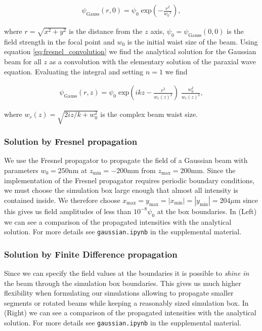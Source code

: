 \begin{align*}
    \psi_\text{Gauss}(r,0) = \psi_0 \; \text{exp}  \mathopen{} \left(-\frac{ r^2 }{{w_0}^{2}} \right) \mathclose{},
\end{align*}

where $r = \sqrt{x^2 + y^2}$ is the distance from the $z$ axis, $\psi_0 = \psi_\text{Gauss}(0,0)$ is the field strength in the focal point and $w_0$ is the initial waist size of the beam. Using equation \eqref{eq:fresnel_convolution} we find the analytical solution for the Gaussian beam for all $z$ as a convolution with the elementary solution of the paraxial wave equation. Evaluating the integral and setting $n = 1$ we find

\begin{align*}
    \psi_\text{Gauss}(r,z) = \psi_0 \; \text{exp} \mathopen{} \left(i k z -\frac{ r^2 }{{w_r(z)}^{2}} \right) \mathclose{} \; \frac{w_0^2}{w_r(z)^2} ,
\end{align*}

where $w_r(z) = \sqrt{2iz/k + w_0^2}$ is the complex beam waist size.

\subsubsection{Solution by Fresnel propagation}

We use the Fresnel propagator to propagate the field of a Gaussian beam with parameters $w_0 = 250\text{nm}$ at $z_\text{min} = -200\mathrm{mm}$ from $z_\text{max} = 200\mathrm{mm}$. Since the implementation of the Fresnel propagator requires periodic boundary conditions, we must choose the simulation box large enough that almost all intensity is contained inside. We therefore choose $x_\text{max} = y_\text{max} = |x_\text{min}| = |y_\text{min}| = 204 \mu\text{m}$ since this gives us field amplitudes of less than $10^{-8} \psi_0$ at the box boundaries. In  (Left) we can see a comparison of the propagated intensities with the analytical solution. For more details see \lstinline{gaussian.ipynb} in the supplemental material.


\subsubsection{Solution by Finite Difference propagation}

Since we can specify the field values at the boundaries it is possible to \emph{shine in} the beam through the simulation box boundaries. This gives us much higher flexibility when formulating our simulations allowing to propagate smaller segments or rotated beams while keeping a reasonably sized simulation box.  In  (Right) we can see a comparison of the propagated intensities with the analytical solution. For more details see \lstinline{gaussian.ipynb} in the supplemental material.









